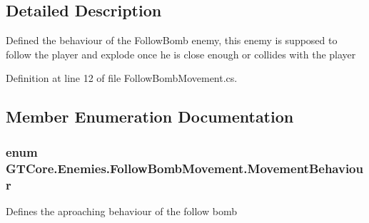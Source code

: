 \subsection{Detailed Description}
Defined the behaviour of the Follow\+Bomb enemy, this enemy is supposed to follow the player and explode once he is close enough or collides with the player 



Definition at line 12 of file Follow\+Bomb\+Movement.\+cs.



\subsection{Member Enumeration Documentation}
\hypertarget{class_g_t_core_1_1_enemies_1_1_follow_bomb_movement_adf9532fc09595ec68cbe32713697fa48}{}
\subsubsection[{Movement\+Behaviour}]{\setlength{\rightskip}{0pt plus 5cm}enum {\bf G\+T\+Core.\+Enemies.\+Follow\+Bomb\+Movement.\+Movement\+Behaviour}\hspace{0.3cm}{\ttfamily [strong]}}\label{class_g_t_core_1_1_enemies_1_1_follow_bomb_movement_adf9532fc09595ec68cbe32713697fa48}


Defines the aproaching behaviour of the follow bomb 

